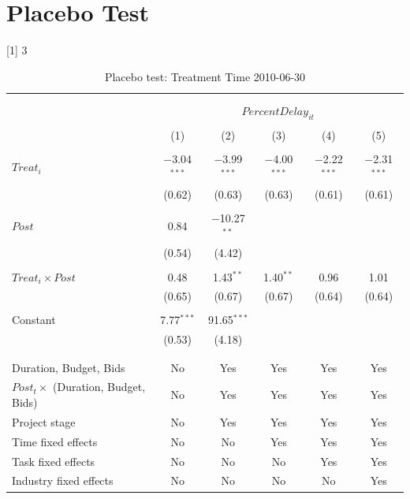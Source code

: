 \documentclass[
]{article}
\begin{document}
\hypertarget{placebo-test}{%
\section{Placebo Test}\label{placebo-test}}

{[}1{]} 3

\begin{table}[H] \centering 
  \caption{Placebo test: Treatment Time 2010-06-30} 
  \label{} 
\small 
\begin{tabular}{@{\extracolsep{-2pt}}lccccc} 
\\[-1.8ex]\hline 
\hline \\[-1.8ex] 
\\[-1.8ex] & \multicolumn{5}{c}{$PercentDelay_{it}$} \\ 
\\[-1.8ex] & (1) & (2) & (3) & (4) & (5)\\ 
\hline \\[-1.8ex] 
 $Treat_i$ & $-$3.04$^{***}$ & $-$3.99$^{***}$ & $-$4.00$^{***}$ & $-$2.22$^{***}$ & $-$2.31$^{***}$ \\ 
  & (0.62) & (0.63) & (0.63) & (0.61) & (0.61) \\ 
  & & & & & \\ 
 $Post$ & 0.84 & $-$10.27$^{**}$ &  &  &  \\ 
  & (0.54) & (4.42) &  &  &  \\ 
  & & & & & \\ 
 $Treat_i \times Post$ & 0.48 & 1.43$^{**}$ & 1.40$^{**}$ & 0.96 & 1.01 \\ 
  & (0.65) & (0.67) & (0.67) & (0.64) & (0.64) \\ 
  & & & & & \\ 
 Constant & 7.77$^{***}$ & 91.65$^{***}$ &  &  &  \\ 
  & (0.53) & (4.18) &  &  &  \\ 
  & & & & & \\ 
\hline \\[-1.8ex] 
Duration, Budget, Bids & No & Yes & Yes & Yes & Yes \\ 
$Post_t \times$  (Duration, Budget, Bids) & No & Yes & Yes & Yes & Yes \\ 
Project stage & No & Yes & Yes & Yes & Yes \\ 
Time fixed effects & No & No & Yes & Yes & Yes \\ 
Task fixed effects & No & No & No & Yes & Yes \\ 
Industry fixed effects & No & No & No & No & Yes \\ 

\end{tabular}
\end{table}
\end{document}
